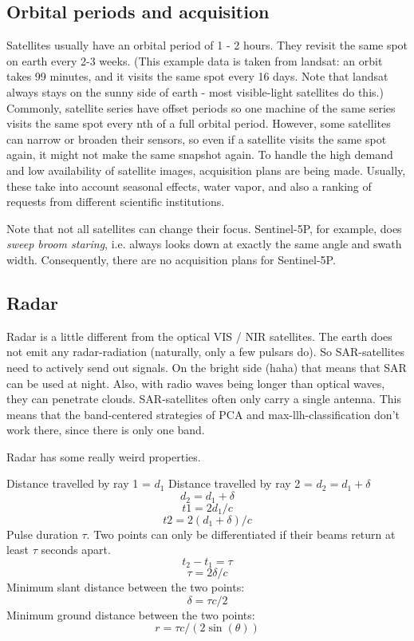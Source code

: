 \subsection{Orbital periods and acquisition}
Satellites usually have an orbital period of 1 - 2 hours. They revisit the same spot on earth every 2-3 weeks.
(This example data is taken from landsat: an orbit takes 99 minutes, and it visits the same spot every 16 days.
Note that landsat always stays on the sunny side of earth - most visible-light satellites do this.)
Commonly, satellite series have offset periods so one machine of the same series
visits the same spot every nth of a full orbital period.
However, some satellites can narrow or broaden their sensors, so even if
a satellite visits the same spot again, it might not make the same snapshot again.
To handle the high demand and low availability of satellite images, acquisition plans are being made.
Usually, these take into account seasonal effects,
water vapor, and also a ranking of requests from different scientific institutions.


Note that not all satellites can change their focus. Sentinel-5P, for example, does \emph{sweep broom staring}, i.e. always looks down at exactly the same angle and swath width.
Consequently, there are no acquisition plans for Sentinel-5P.





\subsection{Radar}
Radar is a little different from the optical VIS / NIR satellites.
The earth does not emit any radar-radiation (naturally, only a few pulsars do). So SAR-satellites need to actively send out signals.
On the bright side (haha) that means that SAR can be used at night. Also, with radio waves being longer than optical waves, they can penetrate clouds.
SAR-satellites often only carry a single antenna. This means that the band-centered strategies of PCA and max-llh-classification don't work there, since there is only one band.


Radar has some really weird properties.

Distance travelled by ray 1 = $d_1$
Distance travelled by ray 2 = $d_2 = d_1 + \delta $
$$d_2 = d_1 + \delta$$
$$t1 = 2 d_1 / c$$
$$t2 = 2 (d_1 + \delta) / c$$
Pulse duration $\tau$. Two points can only be differentiated if their beams return at least $\tau$ seconds apart.
$$t_2 - t_1 = \tau $$
$$ \tau = 2 \delta / c$$
Minimum slant distance between the two points:
$$\delta = \tau c / 2$$
Minimum ground distance between the two points:
$$r = \tau c / (2 \sin(\theta) )$$

